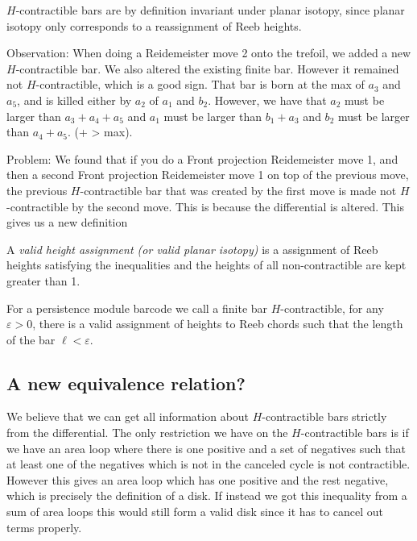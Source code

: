 \documentclass[11pt,oneside]{amsart}
\begin{document}
$H$-contractible bars are by definition invariant under planar isotopy, since planar isotopy only corresponds to a reassignment of Reeb heights.

Observation: When doing a Reidemeister move 2 onto the trefoil, we added a new $H$-contractible bar. We also altered the existing finite bar. However it remained not $H$-contractible, which is a good sign. That bar is born at the max of $a_3$ and $a_5$, and is killed either by $a_2$ of $a_1$ and $b_2$. However, we have that $a_2$ must be larger than $a_3 + a_4 + a_5$ and $a_1$ must be larger than $b_1 + a_3 $ and $b_2$ must be larger than $a_4 + a_5$. (+ > max).

Problem: We found that if you do a Front projection Reidemeister move 1, and then a second Front projection Reidemeister move 1 on top of the previous move, the previous $H$-contractible bar that was created by the first move is made not $H$-contractible by the second move. This is because the differential is altered. This gives us a new definition

\begin{definition}
    A \textit{valid height assignment (or valid planar isotopy)} is a assignment of Reeb heights satisfying the inequalities and the heights of all non-contractible are kept greater than 1.
\end{definition}
\begin{definition}
    For a persistence module barcode we call a finite bar $H$-contractible, for any $\varepsilon > 0$, there is a valid assignment of heights to Reeb chords such that the length of the bar $\ell < \varepsilon$.
\end{definition}


\subsection{A new equivalence relation?}

We believe that we can get all information about $H$-contractible bars strictly from the differential. The only restriction we have on the $H$-contractible bars is if we have an area loop where there is one positive and a set of negatives such that at least one of the negatives which is not in the canceled cycle is not contractible. However this gives an area loop which has one positive and the rest negative, which is precisely the definition of a disk. If instead we got this inequality from a sum of area loops this would still form a valid disk since it has to cancel out terms properly.
\end{document}
